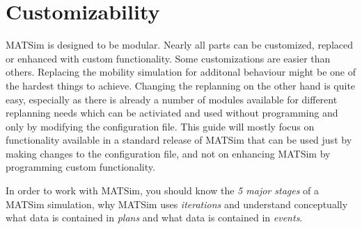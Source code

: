 \section{Customizability}
MATSim is designed to be modular. Nearly all parts can be customized, replaced
or enhanced with custom functionality. Some customizations are easier than
others. Replacing the mobility simulation for additonal behaviour might be one
of the hardest things to achieve. Changing the replanning on the other hand is
quite easy, especially as there is already a number of modules available for
different replanning needs which can be activiated and used without programming
and only by modifying the configuration file. This guide will mostly focus on
functionality available in a standard release of MATSim that can be used just by
making changes to the configuration file, and not on enhancing MATSim by
programming custom functionality.


\begin{note}
In order to work with MATSim, you should know the \emph{5 major stages} of a
MATSim simulation, why MATSim uses \emph{iterations} and understand conceptually what
data is contained in \emph{plans} and what data is contained in \emph{events}.
\end{note}
